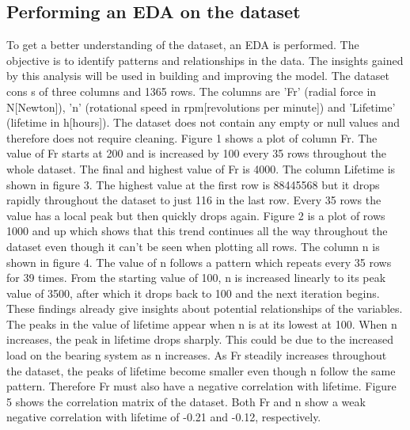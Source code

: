 \documentclass[letterpaper,10pt]{article}
\begin{document}
	\subsection{Performing an EDA on the dataset}
	To get a better understanding of the dataset, an EDA is performed. The objective is to identify patterns and relationships in the data. The insights gained by this analysis will be used in building and improving the model.
	\newline The dataset cons s of three columns and 1365 rows. The columns are 'Fr' (radial force in N[Newton]), 'n' (rotational speed in rpm[revolutions per minute]) and 'Lifetime' (lifetime in h[hours]). The dataset does not contain any empty or null values and therefore does not require cleaning.
	\newline Figure 1 shows a plot of column Fr. The value of Fr starts at 200 and is increased by 100 every 35 rows throughout the whole dataset. The final and highest value of Fr is 4000. 
	\newline The column Lifetime is shown in figure 3. The highest value at the first row is 88445568 but it drops rapidly throughout the dataset to just 116 in the last row. Every 35 rows the value has a local peak but then quickly drops again. Figure 2 is a plot of rows 1000 and up which shows that this trend continues all the way throughout the dataset even though it can't be seen when plotting all rows. 
	\newline The column n is shown in figure 4. The value of n follows a pattern which repeats every 35 rows for 39 times. From the starting value of 100, n is  increased linearly to its peak value of 3500, after which it drops back to 100 and the next iteration begins. 
	\newline These findings already give insights about potential relationships of the variables. The peaks in the value of lifetime appear when n is at its lowest at 100. When n increases, the peak in lifetime drops sharply. This could be due to the increased load on the bearing system as n increases. As Fr steadily increases throughout the dataset, the peaks of lifetime become smaller even though n follow the same pattern. Therefore Fr must also have a negative correlation with lifetime.
	\newline Figure 5 shows the correlation matrix of the dataset. Both Fr and n show a weak negative correlation with lifetime of -0.21 and -0.12, respectively. 
	
	
	
	
	
\end{document}
